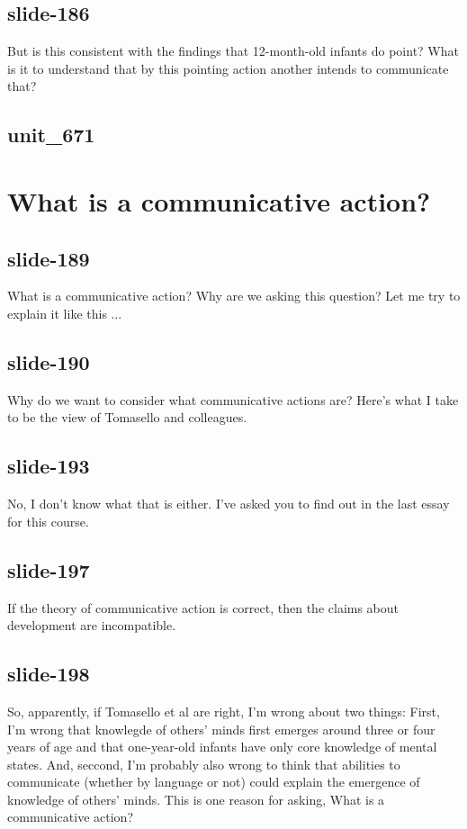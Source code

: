 \documentclass[12pt,\papersize]{extarticle}
\begin{document}
 
\subsection{slide-186}
But is this consistent with the findings that 12-month-old infants do point?
What is it to understand that by this pointing action another intends to communicate that?
 
 
\subsection{unit\_671}
 
\section{What is a communicative action?}
 
 
\subsection{slide-189}
What is a communicative action?
Why are we asking this question?
Let me try to explain it like this ...
 
 
\subsection{slide-190}
Why do we want to consider what communicative actions are?
Here's what I take to be the view of Tomasello and colleagues.
 
 
\subsection{slide-193}
No, I don't know what that is either. I've asked you to find out in the last essay for this course.
 
 
\subsection{slide-197}
If the theory of communicative action is correct, then the claims about development are incompatible.
 
 
\subsection{slide-198}
So, apparently, if Tomasello et al are right, I'm wrong about two things:
First, I'm wrong that knowlegde of others' minds first emerges around three or four years of age and that one-year-old infants have only core knowledge of mental states.
And, seccond, I'm probably also wrong to think that abilities to communicate (whether by language or not) could explain the emergence of knowledge of others' minds.
This is one reason for asking, What is a communicative action?
 
\end{document}
